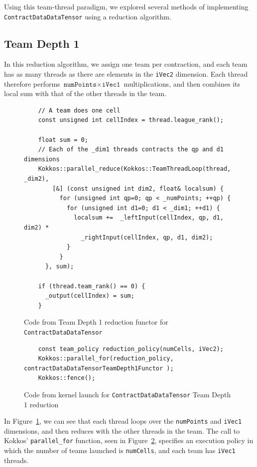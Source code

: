 Using this team-thread paradigm, we explored several methods of implementing
\texttt{ContractDataDataTensor} using a reduction algorithm.

\subsection{Team Depth 1}
    In this reduction algorithm, we assign one team per contraction, and each
    team has as many threads as there are elements in the \texttt{iVec2}
    dimension.  Each thread therefore performs $\texttt{numPoints} \times
    \texttt{iVec1}$ multiplications, and then combines its local sum with that
    of the other threads in the team.


\begin{figure}[ht]
    \begin{lstlisting}
    // A team does one cell
    const unsigned int cellIndex = thread.league_rank();

    float sum = 0;
    // Each of the _dim1 threads contracts the qp and d1 dimensions
    Kokkos::parallel_reduce(Kokkos::TeamThreadLoop(thread, _dim2),
        [&] (const unsigned int dim2, float& localsum) {
          for (unsigned int qp=0; qp < _numPoints; ++qp) {
            for (unsigned int d1=0; d1 < _dim1; ++d1) {
              localsum +=  _leftInput(cellIndex, qp, d1, dim2) *
                _rightInput(cellIndex, qp, d1, dim2);
            }
          }
      }, sum);

    if (thread.team_rank() == 0) {
      _output(cellIndex) = sum;
    }
 \end{lstlisting}
\caption{Code from Team Depth 1 reduction functor for \texttt{ContractDataDataTensor}
\label{lst:ContractDataDataTensorDepth1Functor}} 
\end{figure}

\begin{figure}[ht]
    \begin{lstlisting}
    const team_policy reduction_policy(numCells, iVec2);
    Kokkos::parallel_for(reduction_policy, contractDataDataTensorTeamDepth1Functor );
    Kokkos::fence();
 \end{lstlisting}
\caption{Code from kernel launch for \texttt{ContractDataDataTensor} Team Depth
1 reduction
\label{lst:ContractDataDataTensorDepth1Call}} 
\end{figure}

In Figure~\ref{lst:ContractDataDataTensorDepth1Functor}, we can see that each
thread loops over the \texttt{numPoints} and \texttt{iVec1} dimensions, and then
reduces with the other threads in the team.  The call to Kokkos'
\texttt{parallel\_for} function, seen in
Figure~\ref{lst:ContractDataDataTensorDepth1Call}, specifies an execution policy
in which the number of teams launched is \texttt{numCells}, and each team has
\texttt{iVec1} threads.

